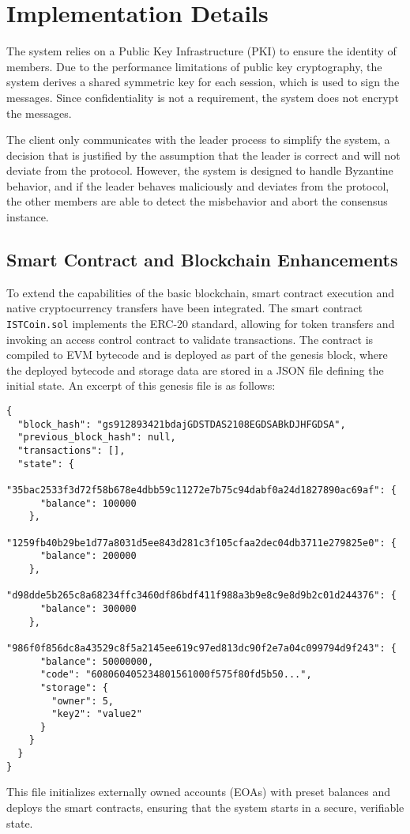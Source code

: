 \documentclass[runningheads]{llncs}
\begin{document}
\section{Implementation Details}
The system relies on a Public Key Infrastructure (PKI) to ensure the identity of
members. Due to the performance limitations of public key cryptography, the
system derives a shared symmetric key for each session, which is used to sign
the messages. Since confidentiality is not a requirement, the system does not
encrypt the messages.

The client only communicates with the leader process to simplify the system, a
decision that is justified by the assumption that the leader is correct and will
not deviate from the protocol. However, the system is designed to handle
Byzantine behavior, and if the leader behaves maliciously and deviates from the
protocol, the other members are able to detect the misbehavior and abort the
consensus instance.

\subsection{Smart Contract and Blockchain Enhancements}
To extend the capabilities of the basic blockchain, smart contract execution and
native cryptocurrency transfers have been integrated. The smart contract
\verb|ISTCoin.sol| implements the ERC-20 standard, allowing for token transfers
and invoking an access control contract to validate transactions. The contract
is compiled to EVM bytecode and is deployed as part of the genesis block, where
the deployed bytecode and storage data are stored in a JSON file defining the
initial state. An excerpt of this genesis file is as follows:
\begin{verbatim}
{
  "block_hash": "gs912893421bdajGDSTDAS2108EGDSABkDJHFGDSA",
  "previous_block_hash": null,
  "transactions": [],
  "state": {
    "35bac2533f3d72f58b678e4dbb59c11272e7b75c94dabf0a24d1827890ac69af": { 
      "balance": 100000
    },
    "1259fb40b29be1d77a8031d5ee843d281c3f105cfaa2dec04db3711e279825e0": {
      "balance": 200000
    },
    "d98dde5b265c8a68234ffc3460df86bdf411f988a3b9e8c9e8d9b2c01d244376": {
      "balance": 300000
    },
    "986f0f856dc8a43529c8f5a2145ee619c97ed813dc90f2e7a04c099794d9f243": {
      "balance": 50000000,
      "code": "608060405234801561000f575f80fd5b50...",
      "storage": {
        "owner": 5,
        "key2": "value2"
      }
    }
  }
}
\end{verbatim}
This file initializes externally owned accounts (EOAs) with preset balances and
deploys the smart contracts, ensuring that the system starts in a secure,
verifiable state.
\end{document}
